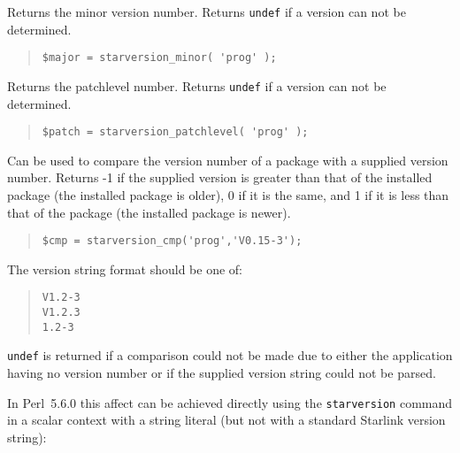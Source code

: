 \documentclass[twoside,11pt]{article}
\newenvironment{myquote}{\begin{quote}\begin{small}}{\end{small}\end{quote}}
\newcommand{\perl}{\xref{\textsf{Perl}}{sun193}{}}
\newcommand{\xref}[3]{#1}
\renewcommand{\_}{\texttt{\symbol{95}}}
\begin{document}
\begin{description}
Returns the minor version number. Returns \texttt{undef} if a version
can not be determined.

\begin{myquote}
\begin{verbatim}
$major = starversion_minor( 'prog' );
\end{verbatim} 
\end{myquote} %

\item[starversion\_patchlevel] \mbox{}

Returns the patchlevel number. Returns \texttt{undef} if a version
can not be determined.

\begin{myquote}
\begin{verbatim}
$patch = starversion_patchlevel( 'prog' );
\end{verbatim} 
\end{myquote} %

\item[starversion\_cmp] \mbox{}
  
  Can be used to compare the version number of a package with a supplied
  version number. Returns -1 if the supplied version is greater than that of
  the installed package (the installed package is older), 0 if it is the same,
  and 1 if it is less than that of the package (the installed package is
  newer).

\begin{myquote}
\begin{verbatim}
$cmp = starversion_cmp('prog','V0.15-3');
\end{verbatim}
\end{myquote} %

The version string format should be one of:

\begin{myquote}
\begin{verbatim}
V1.2-3
V1.2.3
1.2-3
\end{verbatim}
\end{myquote}

\texttt{undef} is returned if a comparison could not be made due to
either the application having no version number or if the 
supplied version string could not be parsed.



In \perl\ 5.6.0 this affect can be achieved directly using
the \texttt{starversion} command in a scalar context with a string literal
(but not with a standard Starlink version string):


\end{description}
\end{document}

